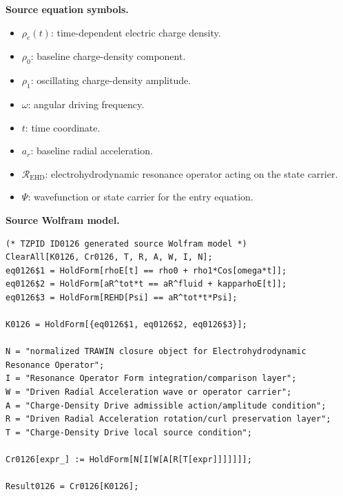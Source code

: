 \begin{minipage}[t]{0.49\linewidth}
\begingroup
\small
\raggedright
\textbf{Source equation symbols.}\par
\begin{itemize}[leftmargin=1.35em,itemsep=1pt,topsep=1pt,parsep=0pt]
    \item $\rho_e(t)$: time-dependent electric charge density.
    \item $\rho_0$: baseline charge-density component.
    \item $\rho_1$: oscillating charge-density amplitude.
    \item $\omega$: angular driving frequency.
    \item $t$: time coordinate.
    \item $a_r$: baseline radial acceleration.
    \item $\mathcal{R}_{\mathrm{EHD}}$: electrohydrodynamic resonance operator acting on the state carrier.
    \item $\Psi$: wavefunction or state carrier for the entry equation.
\end{itemize}
\endgroup
\end{minipage}\hfill
\begin{minipage}[t]{0.47\linewidth}
\begingroup
\scriptsize
\raggedright
\textbf{Source Wolfram model.}\par
\begin{Verbatim}[fontsize=\tiny,breaklines=true,breakanywhere=true]
(* TZPID ID0126 generated source Wolfram model *)
ClearAll[K0126, Cr0126, T, R, A, W, I, N];
eq0126$1 = HoldForm[rhoE[t] == rho0 + rho1*Cos[omega*t]];
eq0126$2 = HoldForm[aR^tot*t == aR^fluid + kapparhoE[t]];
eq0126$3 = HoldForm[REHD[Psi] == aR^tot*t*Psi];

K0126 = HoldForm[{eq0126$1, eq0126$2, eq0126$3}];

N = "normalized TRAWIN closure object for Electrohydrodynamic Resonance Operator";
I = "Resonance Operator Form integration/comparison layer";
W = "Driven Radial Acceleration wave or operator carrier";
A = "Charge-Density Drive admissible action/amplitude condition";
R = "Driven Radial Acceleration rotation/curl preservation layer";
T = "Charge-Density Drive local source condition";

Cr0126[expr_] := HoldForm[N[I[W[A[R[T[expr]]]]]]];

Result0126 = Cr0126[K0126];
\end{Verbatim}
\endgroup
\end{minipage}

